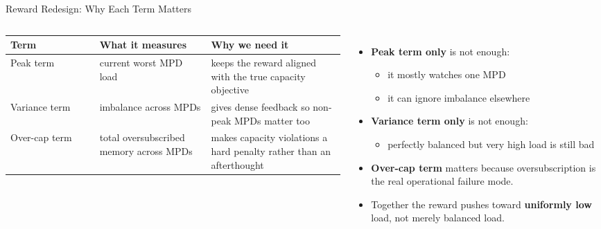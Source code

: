 \documentclass[10pt,aspectratio=169]{beamer}
\begin{document}
\begin{frame}{Reward Redesign: Why Each Term Matters}
  \begin{columns}[T,onlytextwidth]
      \small
      \begin{tabular}{p{0.24\linewidth}p{0.30\linewidth}p{0.36\linewidth}}
        \toprule
        \textbf{Term} & \textbf{What it measures} & \textbf{Why we need it} \\
        \midrule
        Peak term & current worst MPD load & keeps the reward aligned with the true capacity objective \\
        Variance term & imbalance across MPDs & gives dense feedback so non-peak MPDs matter too \\
        Over-cap term & total oversubscribed memory across MPDs & makes capacity violations a hard penalty rather than an afterthought \\
        \bottomrule
      \end{tabular}
      \begin{itemize}
        \item \textbf{Peak term only} is not enough:
          \begin{itemize}
            \item it mostly watches one MPD
            \item it can ignore imbalance elsewhere
          \end{itemize}
        \item \textbf{Variance term only} is not enough:
          \begin{itemize}
            \item perfectly balanced but very high load is still bad
          \end{itemize}
        \item \textbf{Over-cap term} matters because oversubscription is the real operational failure mode.
        \item Together the reward pushes toward \textbf{uniformly low} load, not merely balanced load.
      \end{itemize}
  \end{columns}
\end{frame}
\end{document}
